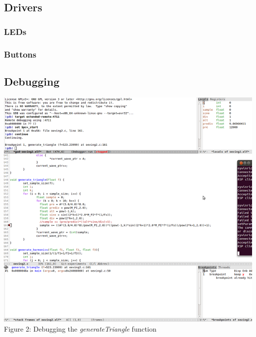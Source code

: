 \documentclass[a4paper,11pt]{article}
\begin{document}
\subsection{Drivers}
\subsubsection{LEDs}

\subsubsection{Buttons}



\subsection*{Debugging}




\begin{center}
\includegraphics{images/debugsmall.png}
Figure 2: Debugging the \emph{generateTriangle} function
\end{center}
\end{document}
